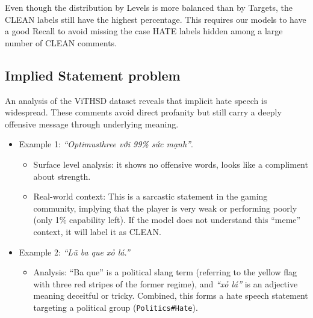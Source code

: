 \documentclass[11pt]{article}
\begin{document}
\begin{table}[ht]
\centering
\caption{Distribution by Intensity (Level)}
\label{tab:level_dist}
\setlength{\tabcolsep}{2.5pt} 
\footnotesize 
\end{table}
Even though the distribution by Levels is more balanced than by Targets, the CLEAN labels
still have the highest percentage. This requires our models to have a good Recall to avoid
missing the case HATE labels hidden among a large number of CLEAN comments.

\subsection{Implied Statement problem}
An analysis of the ViTHSD dataset reveals that implicit hate speech is widespread. These
comments avoid direct profanity but still carry a deeply offensive message through underlying
meaning.
\begin{itemize}[leftmargin=*]
\item Example 1: \foreignlanguage{vietnamese}{\textit{``Optimusthree với 99\% sức mạnh''}}.
\begin{itemize}[leftmargin=*]
\item Surface level analysis: it shows no offensive words, looks like a compliment about
strength.
\item Real-world context: This is a sarcastic statement in the gaming community,
implying that the player is very weak or performing poorly (only 1\% capability left).
If the model does not understand this ``meme'' context, it will label it as CLEAN.
\end{itemize}
\item Example 2: \foreignlanguage{vietnamese}{\textit{``Lũ ba que xỏ lá.''}}
\begin{itemize}[leftmargin=*]
\item Analysis: ``Ba que'' is a political slang term (referring to the yellow flag with three
red stripes of the former regime), and \foreignlanguage{vietnamese}{\textit{``xỏ lá''}} is an adjective meaning deceitful or
tricky. Combined, this forms a hate speech statement targeting a political group
(\texttt{Politics\#Hate}).
\end{itemize}
\end{itemize}
\end{document}
